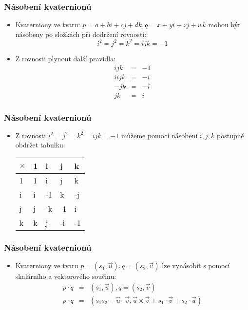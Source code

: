 \begin{frame}
\frametitle{Násobení kvaternionů}
\begin{itemize}
\item Kvaterniony ve tvaru: $p=a+bi+cj+dk,q=x+yi+zj+wk$ mohou být násobeny po složkách při dodržení rovnosti:
$$i^2=j^2=k^2=ijk=-1$$
\item Z rovnosti plynout další pravidla:
\begin{eqnarray*}
ijk &=& -1\\
iijk &=& -i\\
-jk &=& -i\\
jk &=& i
\end{eqnarray*}
\end{itemize}
\end{frame}

\begin{frame}
\frametitle{Násobení kvaternionů}
\begin{itemize}
\item Z rovnosti $i^2=j^2=k^2=ijk=-1$ můžeme pomocí násobení $i,j,k$ postupně obdržet tabulku:
\begin{table}
\centering
\begin{tabular}{ |l||l|l|l|l| }
\hline
$\times$ & 1 & i & j & k \\
\hline
\hline
1 & 1 &  i &  j &  k \\
\hline
i & i & -1 &  k & -j \\
\hline
j & j & -k & -1 &  i \\
\hline
k & k &  j & -i & -1 \\
\hline
\end{tabular}
\end{table}
\end{itemize}
\end{frame}

\begin{frame}
\frametitle{Násobení kvaternionů}
\begin{itemize}
\item Kvaterniony ve tvaru $p=(s_1,\vec u),q=(s_2,\vec v)$ lze vynásobit s pomocí skalárního a vektorového součinu:
\begin{eqnarray*}
p\cdot q &=& (s_1,\vec u),q=(s_2,\vec v)\\
p\cdot q &=& (s_1s_2-\vec u\cdot \vec v,\vec u \times \vec v + s_1\cdot \vec v + s_2 \cdot \vec u)
\end{eqnarray*}
\end{itemize}
\end{frame}

